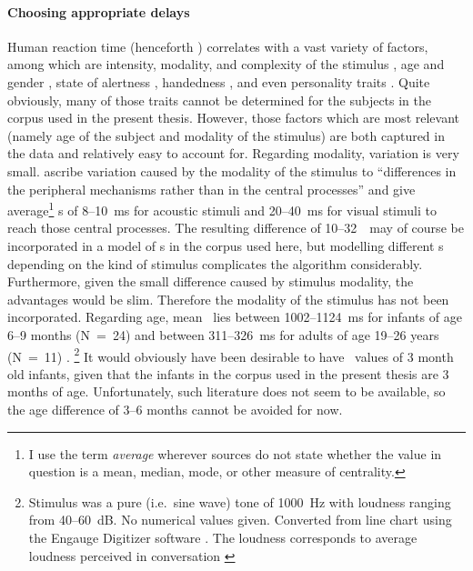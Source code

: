 \paragraph{Choosing appropriate delays}
Human reaction time (henceforth \rt) correlates with a vast variety of factors, among which are intensity, modality, and complexity of the stimulus \citep{brebner_introduction:_1980}, age and gender \citep{der_age_2006}, state of alertness \citep{appelle_simple_1974}, handedness \citep{dane_sex_2003}, and even personality traits \citep{stelmack_personality_1993}.
Quite obviously, many of those traits cannot be determined for the subjects in the corpus used in the present thesis.
However, those factors which are most relevant (namely age of the subject and modality of the stimulus) are both captured in the data and relatively easy to account for.
Regarding modality, variation is very small.
\citet[]{brebner_introduction:_1980} ascribe variation caused by the modality of the stimulus to ``differences in the peripheral mechanisms rather than in the central processes'' and give average\footnote{I use the term \emph{average} wherever sources do not state whether the value in question is a mean, median, mode, or other measure of centrality.} \rt s of 8--10~ms for acoustic stimuli and 20--40~ms for visual stimuli to reach those central processes.
The resulting difference of 10--32~\ms\ may of course be incorporated in a model of \rt s in the corpus used here, but modelling different \rt s depending on the kind of stimulus complicates the algorithm considerably.
Furthermore, given the small difference caused by stimulus modality, the advantages would be slim.
Therefore the modality of the stimulus has not been incorporated.
Regarding age, mean \rt\ lies  between 1002--1124~ms for infants of age 6--9 months (N~=~24) and between 311--326~ms for adults of age 19--26 years (N~=~11) \citep[]{leibold_relationship_2002}.%
\footnote{Stimulus was a pure (i.e.~sine wave) tone of 1000~Hz with loudness ranging from 40--60~dB.
No numerical values given.
Converted from line chart using the Engauge Digitizer software \citep{mitchell_engauge_2002}.
The loudness corresponds to average loudness perceived in conversation \citep[]{gorne_tontechnik_2006}}
It would obviously have been desirable to have \rt\ values of 3 month old infants, given that the infants in the  corpus used in the present thesis are 3 months of age.
Unfortunately, such literature does not seem to be available, so the age difference of 3--6 months cannot be avoided for now.
